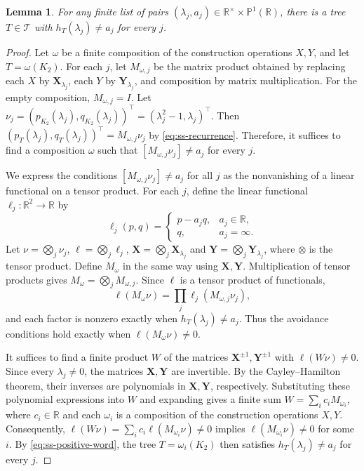 \documentclass[11pt,a4paper]{article}
\theoremstyle{plain}
\newtheorem{lemma}[theorem]{Lemma}
\theoremstyle{definition}
\newcommand{\R}{\mathbb{R}}
\begin{document}
\begin{lemma}\label{lem:ss-caterpillars}
For any finite list of pairs
$(\lambda_j,a_j)\in\R^\times\times\mathbb P^1(\R)$, there is a tree
$T\in\mathcal T$ with $h_T(\lambda_j)\ne a_j$
for every $j$.
\end{lemma}
\begin{proof}
Let $\omega$ be a finite composition of the construction operations
$X,Y$, and let $T=\omega(K_2)$.
For each $j$, let $M_{\omega,j}$ be the matrix product obtained by
replacing each $X$ by $\mathbf{X}_{\lambda_j}$, each $Y$ by
$\mathbf{Y}_{\lambda_j}$, and composition by matrix multiplication.
For the empty composition, $M_{\omega,j}=I$.
Let $\nu_j=(p_{K_2}(\lambda_j),q_{K_2}(\lambda_j))^{\top}
=(\lambda_j^2-1,\lambda_j)^{\top}$.
Then $(p_T(\lambda_j),q_T(\lambda_j))^{\top}=M_{\omega,j}\nu_j$
by \cref{eq:ss-recurrence}.
Therefore, it suffices to find a composition $\omega$ such that
$[M_{\omega,j}\nu_j]\ne a_j$ for every $j$.

We express the conditions $[M_{\omega,j}\nu_j]\ne a_j$ for all $j$
as the nonvanishing of a linear functional on a tensor product.
For each $j$, define the linear functional
$\ell_j:\R^2\to\R$ by
\begin{equation}\label{eq:ss-avoidance-factors}
 \ell_j(p,q)=
 \begin{cases}
  p-a_jq,&a_j\in\R,\\
  q,&a_j=\infty.
 \end{cases}
\end{equation}
Let
$\nu=\bigotimes_j\nu_j$, $\ell=\bigotimes_j\ell_j$,
$\mathbf{X}=\bigotimes_j\mathbf{X}_{\lambda_j}$ and
$\mathbf{Y}=\bigotimes_j\mathbf{Y}_{\lambda_j}$,
where $\otimes$ is the tensor product.
Define $M_\omega$ in the same way using $\mathbf{X},\mathbf{Y}$.
Multiplication of tensor products gives
$M_\omega=\bigotimes_jM_{\omega,j}$.
Since $\ell$ is a tensor product of functionals,
\begin{equation}\label{eq:ss-positive-word}
 \ell(M_\omega\nu)=\prod_j\ell_j(M_{\omega,j}\nu_j),
\end{equation}
and each factor is nonzero exactly when
$h_T(\lambda_j)\ne a_j$.
Thus the avoidance conditions hold exactly when $\ell(M_\omega\nu)\ne0$.

It suffices to find a finite product $W$ of the matrices
$\mathbf{X}^{\pm1},\mathbf{Y}^{\pm1}$ with $\ell(W\nu)\ne0$.
Since every $\lambda_j\ne0$, the matrices $\mathbf{X},\mathbf{Y}$ are
invertible. By the Cayley--Hamilton theorem, their inverses are
polynomials in $\mathbf{X},\mathbf{Y}$, respectively.
Substituting these polynomial expressions into $W$ and expanding gives
a finite sum $W=\sum_i c_iM_{\omega_i}$, where $c_i\in\R$ and each
$\omega_i$ is a composition of the construction operations $X,Y$.
Consequently, $\ell(W\nu)=\sum_i c_i\ell(M_{\omega_i}\nu)\ne0$
implies $\ell(M_{\omega_i}\nu)\ne0$ for some $i$.
By \cref{eq:ss-positive-word}, the tree $T=\omega_i(K_2)$ then satisfies
$h_T(\lambda_j)\ne a_j$ for every $j$.


\end{proof}
\end{document}
